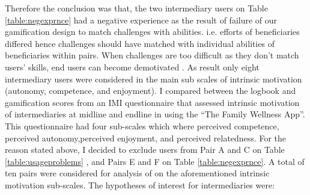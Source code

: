\newline   
Therefore the conclusion was that, the two intermediary users on Table \ref{table:negexprnce}  had a negative experience as the result of failure of our gamification design to match challenges with abilities. i.e. efforts of beneficiaries differed hence challenges should have matched with individual abilities of beneficiaries within pairs. When challenges are too difficult as they don't match users' skills, end users can become demotivated \citep{zhang2008motivational}. As result only eight intermediary users were considered in the main sub scales of intrinsic motivation (autonomy, competence, and enjoyment).\newline
I compared between the logbook and gamification scores from an IMI questionnaire that assessed intrinsic motivation of intermediaries at midline and endline in using the ``The Family Wellness App''. This questionnaire had four sub-scales which where perceived competence, perceived autonomy,perceived enjoyment, and perceived relatedness.  For the reason stated above, I decided to exclude users from  Pair A and C on Table \ref{table:usageproblems} , and Pairs E and F on Table \ref{table:negexprnce}. A total of ten pairs were considered for analysis of on the aforementioned intrinsic motivation sub-scales.\newline
The hypotheses of interest for intermediaries were:
